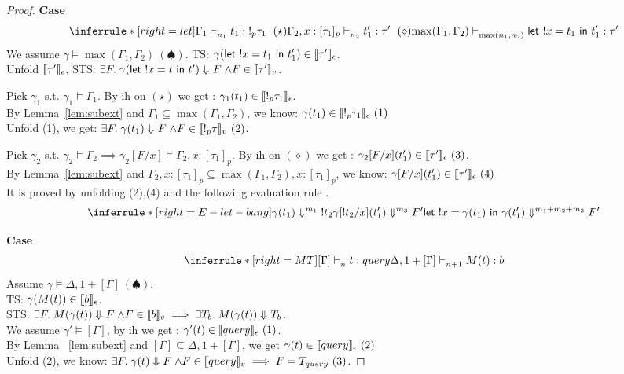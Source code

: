 \documentclass{article}
\begin{document}
\begin{proof}
 
  \noindent \textbf{Case} 
  \[
    \inferrule*[ right = let ]
   {\Gamma_1 \jtype{n_1}{}{t_1}{!_p \tau_1}~(\star) \\ \Gamma_2, x: [\tau_1]_p \jtype{n_2}{}{t_1'}{\tau'}~(\diamond)}
   { \max(\Gamma_1,\Gamma_2) \jtype{\max(n_1,n_2)}{}{\letx{!x}{t_1}{t_1'}}{\tau'}  }
  \]
  We assume $\gamma \vDash \max(\Gamma_1,\Gamma_2 ) ~(\spadesuit) $.
  TS: $ \gamma ( \mathrel{ \mathsf{let}\ {!x} = {t_1} \ \mathsf{in} \ {t_1'} } ) \in \llbracket { \tau'} \rrbracket_{\epsilon} $. \\
  Unfold $ \llbracket { \tau'} \rrbracket_{\epsilon} $, STS: $\exists F. \mathrel{ {\gamma ( \mathrel{ \mathsf{let}\ {!x} = {t} \ \mathsf{in} \ {t'} } )} \Downarrow^{} {F} } \land F \in \llbracket { \tau'} \rrbracket_{v} $.
  
  Pick $\gamma_1$ s.t. $\gamma_1 \vDash \Gamma_1 $. By ih on $(\star)$ we get : $ \gamma_1(t_1) \in \llbracket {!_p \tau_1 } \rrbracket_{\epsilon}$. \\
  By Lemma~\ref{lem:subext} and $\Gamma_1 \subseteq \max(\Gamma_1,\Gamma_2)$, we know: $ \gamma(t_1) \in \llbracket {!_p \tau_1 } \rrbracket_{\epsilon}~(1) $\\
  Unfold (1), we get: $\exists F. \mathrel{ {\gamma(t_1)} \Downarrow^{} {F} } \land F \in \llbracket { !_p \tau} \rrbracket_{v}~(2)  $.  
 
  Pick $\gamma_2$ s.t. $\gamma_2 \vDash \Gamma_2 \implies \gamma_2[F/x] \vDash \Gamma_2, x:[\tau_1]_p $. By ih on $(\diamond)$ we get : $ \gamma_2[F/x](t_1') \in \llbracket { \tau' } \rrbracket_{\epsilon} ~(3)$. \\
  By Lemma~\ref{lem:subext} and $\Gamma_2, x:[\tau_1]_p \subseteq \max(\Gamma_1,\Gamma_2), x:[\tau_1]_p$, we know: $ \gamma[F/x](t_1') \in \llbracket { \tau' } \rrbracket_{\epsilon}~(4) $\\
  

    It is proved by unfolding (2),(4) and the following evaluation rule .
   \[
   \inferrule*[ right=E-let-bang]
  {   
    { \eval{ \gamma(t_1) }{ !t_2  }{m_1} } 
    \\
    { \eval{\gamma[!t_2/x](t_1') }{ F'}{m_3 } }
  }
  { \eval{  \letx{!x}{\gamma(t_1)}{\gamma(t_1')}  }{ F'  }{ m_1+m_2+m_3  } }  
   \]
  
  
   \noindent \textbf{Case} 
   \[
      \inferrule*[ right = MT ]
   {[\Gamma] \jtype{n}{}{t}{query}}
   {\Delta, 1 + [\Gamma] \jtype{n+1}{}{M(t)}{b}  }
   \]
   Assume $\gamma \vDash{\Delta,1+[\Gamma]}~(\spadesuit)$.\\
   TS: $\gamma(M(t)) \in \llbracket {b} \rrbracket_{\epsilon}$.\\
   STS: $\exists F. \mathrel{ {M(\gamma(t))} \Downarrow^{} {F} } \land F \in \llbracket {b} \rrbracket_{v} \implies \exists T_{b}. \mathrel{ {M(\gamma(t))} \Downarrow^{} {T_{b}} }$.\\
   We assume $\gamma' \vDash{[\Gamma]} $,
   by ih we get : $ \gamma'(t) \in \llbracket {query} \rrbracket_{\epsilon}~(1)$.\\
   By Lemma ~\ref{lem:subext} and $[\Gamma] \subseteq \Delta, 1+[\Gamma] $, we get $ \gamma(t) \in \llbracket {query} \rrbracket_{\epsilon}~(2)$\\
   Unfold (2), we know: $\exists F. \mathrel{ {\gamma(t)} \Downarrow^{} {F} } \land F \in \llbracket {query} \rrbracket_{v} \implies F = T_{query} ~(3) $. 
   

\end{proof}
\end{document}
